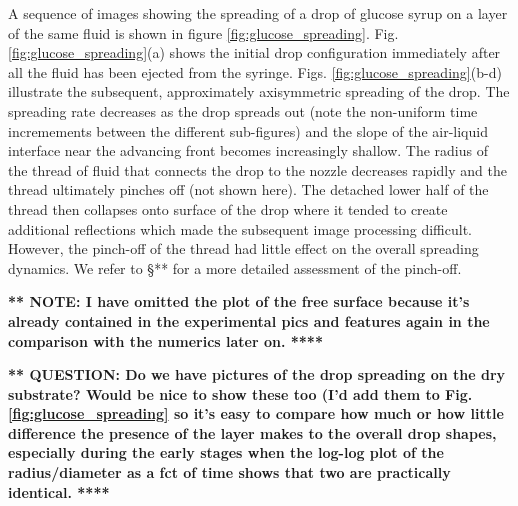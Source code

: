 \documentclass[aip,graphicx]{revtex4-1}
\begin{document}
A sequence of images showing the spreading of a drop
of glucose syrup on a layer of the same fluid is shown in figure
\ref{fig:glucose_spreading}. Fig. \ref{fig:glucose_spreading}(a)
shows the initial drop configuration immediately after all the fluid 
has been ejected from the syringe. Figs. 
\ref{fig:glucose_spreading}(b-d) illustrate the subsequent,
approximately axisymmetric spreading of the drop. The spreading
rate decreases as the drop spreads out (note the non-uniform time
incremements between the different sub-figures) and
the slope of the  air-liquid interface near the advancing front 
becomes increasingly shallow. The radius of the thread of fluid that connects
the drop to the nozzle decreases rapidly and the thread ultimately 
pinches off (not shown here). The detached lower half of the thread 
then collapses onto surface of the drop where it tended to create 
additional reflections which made the subsequent image processing 
difficult. However, the pinch-off of the thread had little effect on the 
overall spreading dynamics. We refer to \S *** for a more detailed
assessment of the pinch-off.



{\bf *** NOTE: I have omitted the plot of the free surface because
it's already contained in the experimental pics and features again
in the comparison with the numerics later on. ****}


{\bf *** QUESTION: Do we have pictures of the drop spreading on the
dry substrate? Would be nice to show these too (I'd add them to Fig.
\ref{fig:glucose_spreading} so it's easy to compare how much
or how little difference the presence of the layer makes to the
overall drop shapes, especially during the early stages when
the log-log plot of the radius/diameter as a fct of time
shows that two are practically identical. ****}
\end{document}
